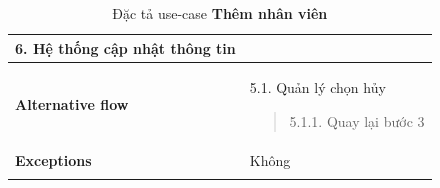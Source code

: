 {\begin{longtable}{| p{} | p{} |}
                    6. Hệ thống cập nhật thông tin
                \\
                \hline
                \begin{flushleft}
                    \textbf{Alternative flow}
                \end{flushleft}
                &
                5.1. Quản lý chọn hủy
                    \begin{quote} 
                    5.1.1. Quay lại bước 3
                    \end{quote}
                \\
                \hline
                    \textbf{Exceptions} 
                &
                    Không
                \\
                \hline
                \caption{Đặc tả use-case \textbf{Thêm nhân viên}}
            \end{longtable}
        }
    
